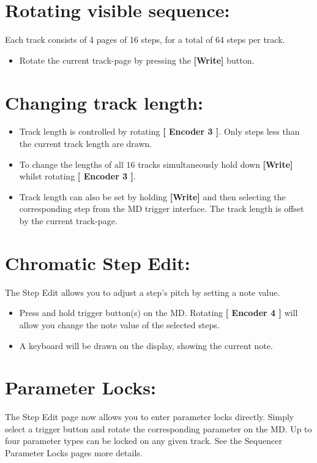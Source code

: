 \vspace{-0.3cm}

\section{Rotating visible sequence:}
Each track consists of 4 pages of 16 steps, for a total of 64 steps per track.
\begin{itemize}
\item Rotate the current track-page by pressing the \textbf{[Write] }button.
\end{itemize}

\vspace{-0.3cm}

\section{Changing track length:}
\begin{itemize}
\item Track length is controlled by rotating \textbf{[ Encoder 3 ]}. Only steps less than the current track length are drawn.
\item To change the lengths of all 16 tracks simultaneously hold down \textbf{[Write]} whilst rotating \textbf{[ Encoder 3 ]}.
\item Track length can also be set by holding \textbf{[Write]} and then selecting the corresponding step from the MD trigger interface. The track length is offset by the current track-page.
\end{itemize}

\section{Chromatic Step Edit:}
The Step Edit allows you to adjust a step's pitch by setting a note value. 
\begin{itemize}
\item Press and hold trigger button(s) on the MD. Rotating \textbf{[ Encoder 4 ]} will allow you change the note value of the selected steps.
\item A keyboard will be drawn on the display, showing the current note.
\end{itemize}

\section{Parameter Locks:}
The Step Edit page now allows you to enter parameter locks directly. Simply select a trigger button and rotate the corresponding parameter on the MD.
Up to four parameter types can be locked on any given track. See the Sequencer Parameter Locks pages more details.

